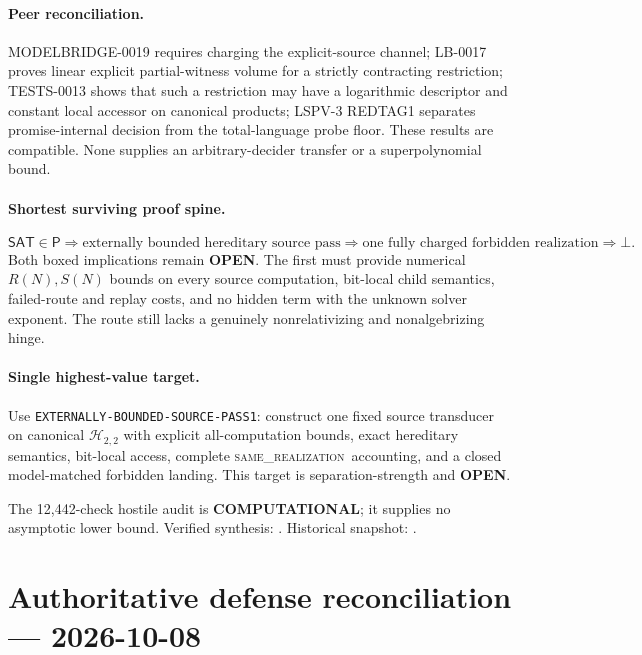 \documentclass[11pt]{article}
\newcommand{\statusopen}{\textcolor{openstatus}{\textbf{OPEN}}}
\newcommand{\same}{\textnormal{\textsc{same\_realization}}}
\begin{document}
\paragraph{Peer reconciliation.}
MODELBRIDGE-0019 requires charging the explicit-source channel; LB-0017 proves
linear explicit partial-witness volume for a strictly contracting restriction;
TESTS-0013 shows that such a restriction may have a logarithmic descriptor and
constant local accessor on canonical products; LSPV-3 REDTAG1 separates
promise-internal decision from the total-language probe floor. These results
are compatible. None supplies an arbitrary-decider transfer or a
superpolynomial bound.

\paragraph{Shortest surviving proof spine.}
\[
\mathsf{SAT}\in\mathsf P
\Longrightarrow
\boxed{\text{externally bounded hereditary source pass}}
\Longrightarrow
\boxed{\text{one fully charged forbidden realization}}
\Longrightarrow\bot .
\]
Both boxed implications remain \statusopen. The first must provide numerical
$R(N),S(N)$ bounds on every source computation, bit-local child semantics,
failed-route and replay costs, and no hidden term with the unknown solver
exponent. The route still lacks a genuinely nonrelativizing and
nonalgebrizing hinge.

\paragraph{Single highest-value target.}
Use \texttt{EXTERNALLY-BOUNDED-SOURCE-PASS1}: construct one fixed source
transducer on canonical $\mathcal H_{2,2}$ with explicit all-computation
bounds, exact hereditary semantics, bit-local access, complete
\same\ accounting, and a closed model-matched forbidden landing. This target
is separation-strength and \statusopen.

The 12,442-check hostile audit is \textbf{COMPUTATIONAL}; it supplies no
asymptotic lower bound. Verified synthesis:
.
Historical snapshot:
.

\clearpage


\section{Authoritative defense reconciliation --- 2026-10-08}
\end{document}
